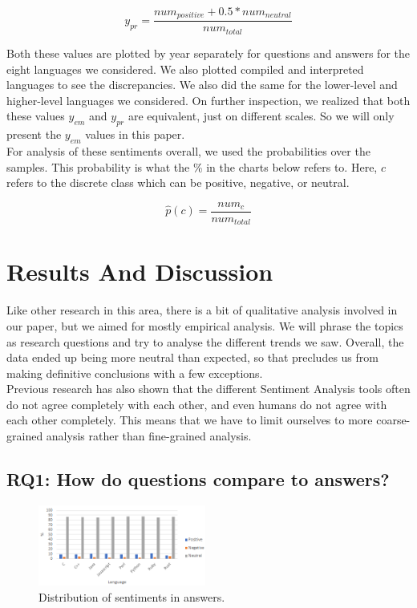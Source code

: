 \documentclass[conference]{IEEEtran}
\begin{document}
\begin{equation}
    y_{pr} = \frac{num_{positive} + 0.5*num_{neutral}}{num_{total}}
\end{equation}

Both these values are plotted by year separately for questions and answers for the eight languages we considered. We also plotted compiled and interpreted languages to see the discrepancies. We also did the same for the lower-level and higher-level languages we considered. On further inspection, we realized that both these values $y_{em}$ and $y_{pr}$ are equivalent, just on different scales. So we will only present the $y_{em}$ values in this paper. \\

For analysis of these sentiments overall, we used the probabilities over the samples. This probability is what the \% in the charts below refers to. Here, $c$ refers to the discrete class which can be positive, negative, or neutral.

\begin{equation}
    \hat{p}(c) = \frac{num_c}{num_{total}}
\end{equation}

\vspace{8pt}
\section{Results And Discussion}
Like other research in this area, there is a bit of qualitative analysis involved in our paper, but we aimed for mostly empirical analysis. We will phrase the topics as research questions and try to analyse the different trends we saw. Overall, the data ended up being more neutral than expected, so that precludes us from making definitive conclusions with a few exceptions. \\

Previous research has also shown that the different Sentiment Analysis tools often do not agree completely with each other, and even humans do not agree with each other completely. This means that we have to limit ourselves to more coarse-grained analysis rather than fine-grained analysis\cite{b26, b35, b36}. \\

\subsection{RQ1: How do questions compare to answers?}

\begin{figure}[htbp]
\centerline{\includegraphics[width=0.49\textwidth]{figures/summNeutralA.png}}
\caption{Distribution of sentiments in answers.}
\label{fig}
\end{figure}
\end{document}
